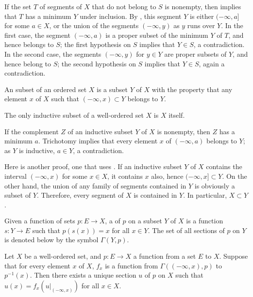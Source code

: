 \documentclass{article}
\begin{document}
If the set \(T\) of segments of \(X\) that do not belong to \(S\) is
nonempty, then  implies that \(T\) has a minimum
\(Y\) under inclusion.  By , this segment \(Y\) is
either \((-\infty, a]\) for some \(a \in X\), or the union of the
segments \((-\infty, y)\) as \(y\) runs over \(Y\).  In the first
case, the segment \((-\infty, a)\) is a proper subset of the minimum
\(Y\) of \(T\), and hence belongs to \(S\); the first hypothesis on
\(S\) implies that \(Y \in S\), a contradiction.  In the second case,
the segments \((-\infty, y)\) for \(y \in Y\) are proper subsets of
\(Y\), and hence belong to \(S\); the second hypothesis on \(S\)
implies that \(Y \in S\), again a contradiction.

An  subset of an ordered set \(X\) is a subset
\(Y\) of \(X\) with the property that any element \(x\) of \(X\) such
that \((-\infty, x) \subset Y\) belongs to \(Y\).

\begin{theorem}
  \label{thm:5vxgawq0}
  The only inductive subset of a well-ordered set \(X\) is \(X\)
  itself.
\end{theorem}

If the complement \(Z\) of an inductive subset \(Y\) of \(X\) is
nonempty, then \(Z\) has a minimum \(a\).  Trichotomy implies that
every element \(x\) of \((-\infty, a)\) belongs to \(Y\); as \(Y\) is
inductive, \(a \in Y\), a contradiction.

Here is another proof, one that uses .  If an
inductive subset \(Y\) of \(X\) contains the interval \((-\infty, x)\)
for some \(x \in X\), it contains \(x\) also, hence
\((-\infty, x] \subset Y\).  On the other hand, the union of any
family of segments contained in \(Y\) is obviously a subset of \(Y\).
Therefore, every segment of \(X\) is contained in \(Y\).  In
particular, \(X \subset Y\).

Given a function of sets \(p : E \to X\), a  of
\(p\) on a subset \(Y\) of \(X\) is a function \(s : Y \to E\) such
that \(p(s(x)) = x\) for all \(x \in Y\).  The set of all sections of
\(p\) on \(Y\) is denoted below by the symbol \(\Gamma(Y, p)\).

\begin{theorem}
  \label{thm:srxrngd8}
  Let \(X\) be a well-ordered set, and \(p : E \to X\) a function from
  a set \(E\) to \(X\).  Suppose that for every element \(x\) of
  \(X\), \(f_x\) is a function from \(\Gamma((-\infty, x), p)\) to
  \(p^{-1}(x)\).  Then there exists a unique section \(u\) of \(p\) on
  \(X\) such that \(u(x) = f_x(u \vert_{(-\infty, x)})\) for all
  \(x \in X\).
\end{theorem}
\end{document}
